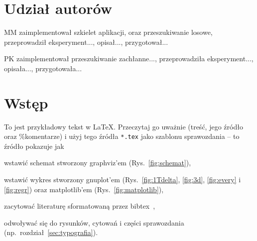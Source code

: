 \documentclass{article}
\begin{document}


\section*{Udział autorów}
\begin{tightlist}
\item MM zaimplementował szkielet aplikacji, oraz przeszukiwanie losowe, przeprowadził eksperyment..., opisał..., przygotował...
\item PK zaimplementował przeszukiwanie zachłanne..., przeprowadziła eksperyment..., opisała..., przygotowała...
\end{tightlist}






\section{Wstęp}



To jest przykładowy tekst w LaTeX. Przeczytaj go uważnie (treść, jego źródło oraz \%komentarze) i użyj tego źródła \texttt{*.tex} jako szablonu sprawozdania -- to źródło pokazuje jak

\begin{tightlist}
\item wstawić schemat stworzony graphviz'em (Rys.~\ref{fig:schemat}),
\item wstawić wykres stworzony gnuplot'em (Rys.~\ref{fig:1Tdelta}, \ref{fig:3d}, \ref{fig:every} i \ref{fig:regr}) oraz matplotlib'em (Rys.~\ref{fig:matplotlib}),
\item zacytować literaturę sformatowaną przez bibtex~\cite{MiOIB,Goldberg-2002},
\item odwoływać się do rysunków, cytowań i części sprawozdania (np.\ rozdział~\ref{sec:typografia}).
\end{tightlist}
\end{document}
